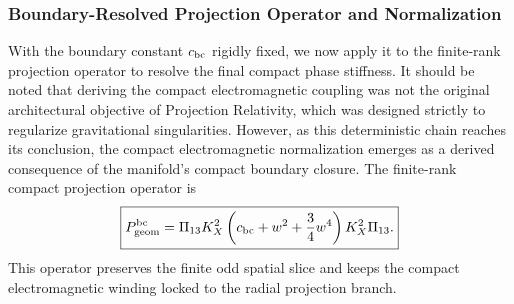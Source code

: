 \documentclass[11pt]{article}
\begin{document}
\subsubsection{Boundary-Resolved Projection Operator and Normalization}
\label{sec:boundary_resolved_projection_operator_normalization}

With the boundary constant \(c_{\rm bc}\) rigidly fixed, we now apply it to the finite-rank projection operator to resolve the final compact phase stiffness. It should be noted that deriving the compact electromagnetic coupling was not the original architectural objective of Projection Relativity, which was designed strictly to regularize gravitational singularities. However, as this deterministic chain reaches its conclusion, the compact electromagnetic normalization emerges as a derived consequence of the manifold's compact boundary closure. The finite-rank compact projection operator is
\begin{equation}
\boxed{
P_{\rm geom}^{\rm bc}
=
\Pi_{13}K_X^2
\left(
c_{\rm bc}+w^2+\frac34w^4
\right)
K_X^2\Pi_{13}.
}
\end{equation}
This operator preserves the finite odd spatial slice and keeps the compact
electromagnetic winding locked to the radial projection branch.
\end{document}
